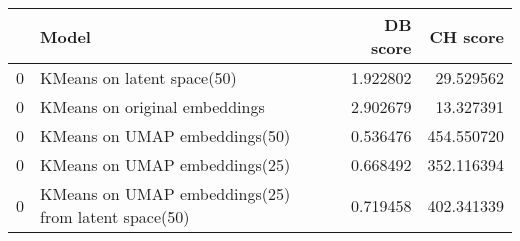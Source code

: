 \begin{tabular}{llrr}
\toprule
 & Model & DB score & CH score \\
\midrule
0 & KMeans on latent space(50) & 1.922802 & 29.529562 \\
0 & KMeans on original embeddings & 2.902679 & 13.327391 \\
0 & KMeans on UMAP embeddings(50) & 0.536476 & 454.550720 \\
0 & KMeans on UMAP embeddings(25) & 0.668492 & 352.116394 \\
0 & KMeans on UMAP embeddings(25) from latent space(50) & 0.719458 & 402.341339 \\
\bottomrule
\end{tabular}
